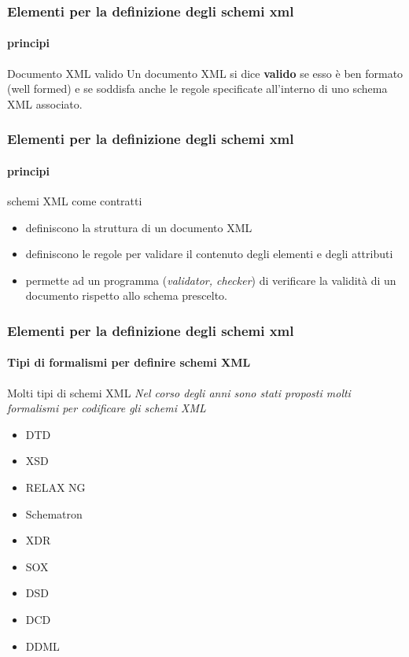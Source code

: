 \begin{frame}
    \frametitle{Elementi per la definizione degli schemi xml}
    \framesubtitle{principi}
    \addtocounter{nframe}{1}
    \begin{block}{Documento XML valido} 
        Un documento XML si dice \textbf{valido} se esso è ben formato (well formed) e se soddisfa anche le regole specificate all'interno di uno schema XML associato.
    \end{block}
    
\end{frame}


\begin{frame}
    \frametitle{Elementi per la definizione degli schemi xml}
    \framesubtitle{principi}
    \addtocounter{nframe}{1}

    \begin{block}{schemi XML come contratti}
        \begin{itemize}
            \item definiscono la struttura di un documento XML
            \item definiscono le regole per validare il contenuto degli elementi e degli attributi
            \item permette ad un programma (\textit{validator, checker}) di verificare la validità di un documento rispetto allo schema prescelto.
        \end{itemize}
    \end{block}

\end{frame}

\begin{frame}
    \frametitle{Elementi per la definizione degli schemi xml}
    \framesubtitle{Tipi di formalismi per definire schemi XML}
    \addtocounter{nframe}{1}

    \begin{block}{Molti tipi di schemi XML}
        \textit{Nel corso degli anni sono stati proposti molti formalismi per codificare gli schemi XML}
        \begin{itemize}
            \item DTD
            \item XSD 
            \item RELAX NG
            \item Schematron
            \item XDR
            \item SOX 
            \item DSD
            \item DCD
            \item DDML
        \end{itemize}
    \end{block}
  

\end{frame}

